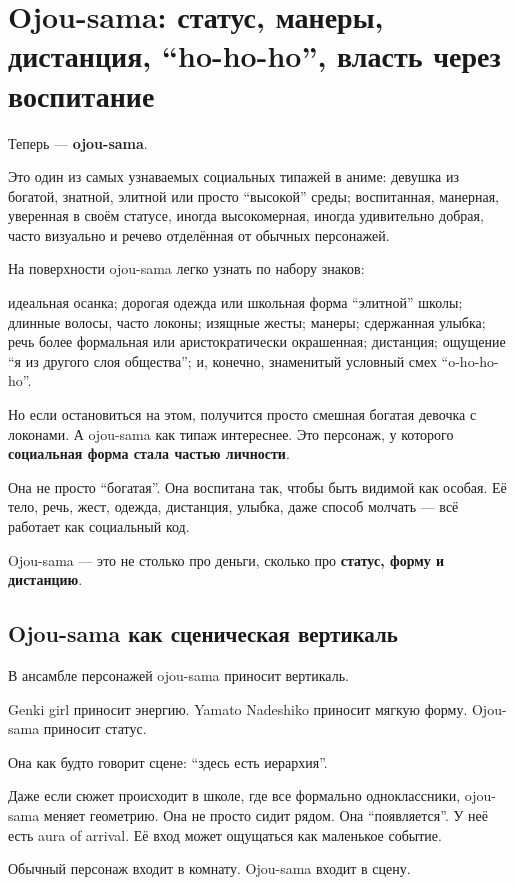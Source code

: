 \section{Ojou-sama: статус, манеры, дистанция, “ho-ho-ho”, власть через воспитание}

Теперь --- \textbf{ojou-sama}.

Это один из самых узнаваемых социальных типажей в аниме: девушка из
богатой, знатной, элитной или просто ``высокой'' среды; воспитанная,
манерная, уверенная в своём статусе, иногда высокомерная, иногда
удивительно добрая, часто визуально и речево отделённая от обычных
персонажей.

На поверхности ojou-sama легко узнать по набору знаков:

идеальная осанка; дорогая одежда или школьная форма ``элитной'' школы;
длинные волосы, часто локоны; изящные жесты; манеры; сдержанная улыбка;
речь более формальная или аристократически окрашенная; дистанция;
ощущение ``я из другого слоя общества''; и, конечно, знаменитый условный
смех ``o-ho-ho-ho''.

Но если остановиться на этом, получится просто смешная богатая девочка с
локонами. А ojou-sama как типаж интереснее. Это персонаж, у которого
\textbf{социальная форма стала частью личности}.

Она не просто ``богатая''. Она воспитана так, чтобы быть видимой как
особая. Её тело, речь, жест, одежда, дистанция, улыбка, даже способ
молчать --- всё работает как социальный код.

Ojou-sama --- это не столько про деньги, сколько про \textbf{статус,
форму и дистанцию}.

\subsection*{Ojou-sama как сценическая вертикаль}

В ансамбле персонажей ojou-sama приносит вертикаль.

Genki girl приносит энергию. Yamato Nadeshiko приносит мягкую форму.
Ojou-sama приносит статус.

Она как будто говорит сцене: ``здесь есть иерархия''.

Даже если сюжет происходит в школе, где все формально одноклассники,
ojou-sama меняет геометрию. Она не просто сидит рядом. Она
``появляется''. У неё есть aura of arrival. Её вход может ощущаться как
маленькое событие.

Обычный персонаж входит в комнату. Ojou-sama входит в сцену.

